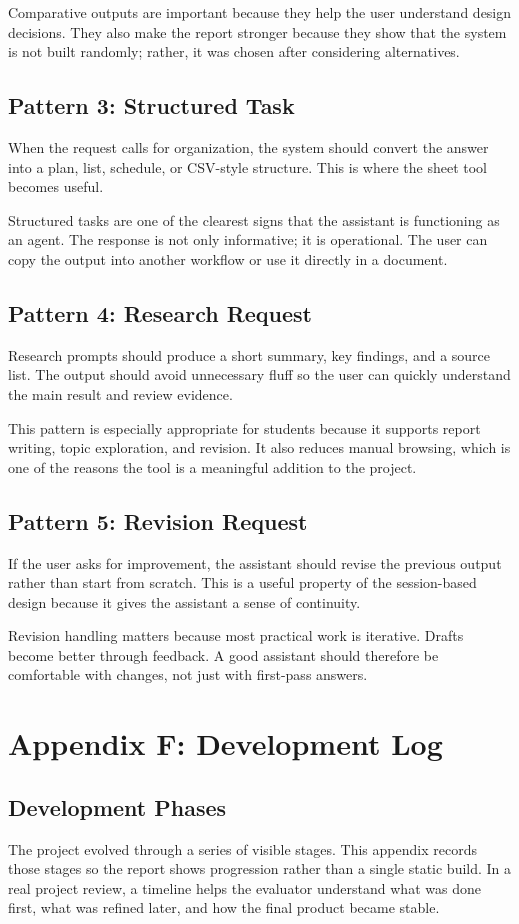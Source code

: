 \documentclass[11pt,oneside]{report}
\begin{document}
Comparative outputs are important because they help the user understand design decisions. They also make the report stronger because they show that the system is not built randomly; rather, it was chosen after considering alternatives.

\section{Pattern 3: Structured Task}
When the request calls for organization, the system should convert the answer into a plan, list, schedule, or CSV-style structure. This is where the sheet tool becomes useful.

Structured tasks are one of the clearest signs that the assistant is functioning as an agent. The response is not only informative; it is operational. The user can copy the output into another workflow or use it directly in a document.

\section{Pattern 4: Research Request}
Research prompts should produce a short summary, key findings, and a source list. The output should avoid unnecessary fluff so the user can quickly understand the main result and review evidence.

This pattern is especially appropriate for students because it supports report writing, topic exploration, and revision. It also reduces manual browsing, which is one of the reasons the tool is a meaningful addition to the project.

\section{Pattern 5: Revision Request}
If the user asks for improvement, the assistant should revise the previous output rather than start from scratch. This is a useful property of the session-based design because it gives the assistant a sense of continuity.

Revision handling matters because most practical work is iterative. Drafts become better through feedback. A good assistant should therefore be comfortable with changes, not just with first-pass answers.

\chapter{Appendix F: Development Log}
\section{Development Phases}
The project evolved through a series of visible stages. This appendix records those stages so the report shows progression rather than a single static build. In a real project review, a timeline helps the evaluator understand what was done first, what was refined later, and how the final product became stable.
\end{document}
